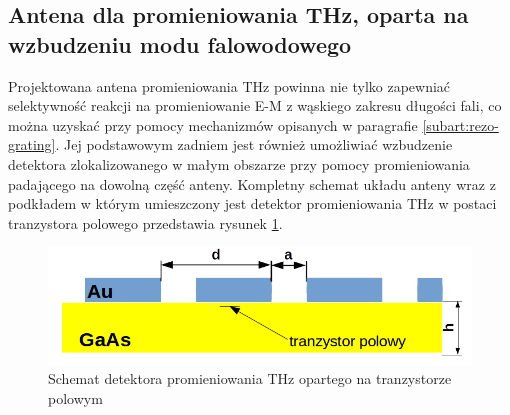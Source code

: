 \subsection{Antena dla promieniowania THz, oparta na wzbudzeniu modu falowodowego}
Projektowana antena promieniowania THz powinna nie tylko zapewniać selektywność reakcji na promieniowanie E-M z wąskiego zakresu długości fali, co można uzyskać przy pomocy mechanizmów opisanych w paragrafie \ref{subart:rezo-grating}. Jej podstawowym zadniem jest również umożliwiać wzbudzenie detektora zlokalizowanego w małym obszarze przy pomocy promieniowania padającego na dowolną część anteny. Kompletny schemat układu anteny wraz z podkładem w którym umieszczony jest detektor promieniowania THz w postaci tranzystora polowego przedstawia rysunek \ref{fig:schem-podklad-falo}.
\begin{figure}
	\centering
	\includegraphics[width=\textwidth]{images/thz/schemat-podklad-falo.png}
	\caption{Schemat detektora promieniowania THz opartego na tranzystorze polowym}
	\label{fig:schem-podklad-falo}
\end{figure}

